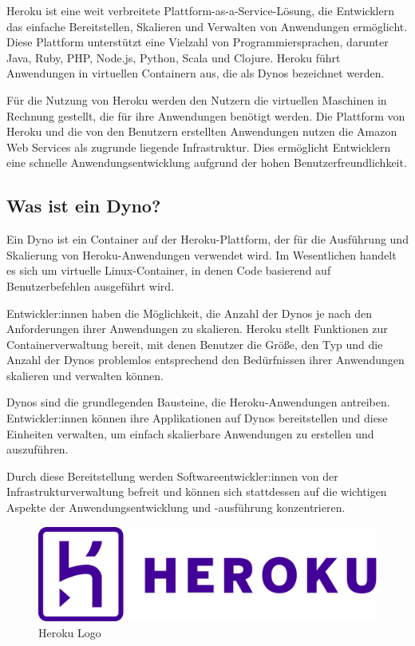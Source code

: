 Heroku ist eine weit verbreitete Plattform-as-a-Service-Lösung, die Entwicklern das einfache Bereitstellen, Skalieren und Verwalten von Anwendungen ermöglicht. Diese Plattform unterstützt eine Vielzahl von Programmiersprachen, darunter Java, Ruby, PHP, Node.js, Python, Scala und Clojure. Heroku führt Anwendungen in virtuellen Containern aus, die als Dynos bezeichnet werden.

Für die Nutzung von Heroku werden den Nutzern die virtuellen Maschinen in Rechnung gestellt, die für ihre Anwendungen benötigt werden. Die Plattform von Heroku und die von den Benutzern erstellten Anwendungen nutzen die Amazon Web Services als zugrunde liegende Infrastruktur. Dies ermöglicht Entwicklern eine schnelle Anwendungsentwicklung aufgrund der hohen Benutzerfreundlichkeit.

\subsection{Was ist ein Dyno?}

Ein Dyno ist ein Container auf der Heroku-Plattform, der für die Ausführung und Skalierung von Heroku-Anwendungen verwendet wird. Im Wesentlichen handelt es sich um virtuelle Linux-Container, in denen Code basierend auf Benutzerbefehlen ausgeführt wird.

Entwickler:innen haben die Möglichkeit, die Anzahl der Dynos je nach den Anforderungen ihrer Anwendungen zu skalieren. Heroku stellt Funktionen zur Containerverwaltung bereit, mit denen Benutzer die Größe, den Typ und die Anzahl der Dynos problemlos entsprechend den Bedürfnissen ihrer Anwendungen skalieren und verwalten können.

Dynos sind die grundlegenden Bausteine, die Heroku-Anwendungen antreiben. Entwickler:innen können ihre Applikationen auf Dynos bereitstellen und diese Einheiten verwalten, um einfach skalierbare Anwendungen zu erstellen und auszuführen.

Durch diese Bereitstellung werden Softwareentwickler:innen von der Infrastrukturverwaltung befreit und können sich stattdessen auf die wichtigen Aspekte der Anwendungsentwicklung und -ausführung konzentrieren.

\begin{figure}[h!]
    \centering
    \includegraphics[width=0.7\linewidth]{pics/heroku.png}
    \caption{Heroku Logo}
    \label{fig:enter-label}
\end{figure}
